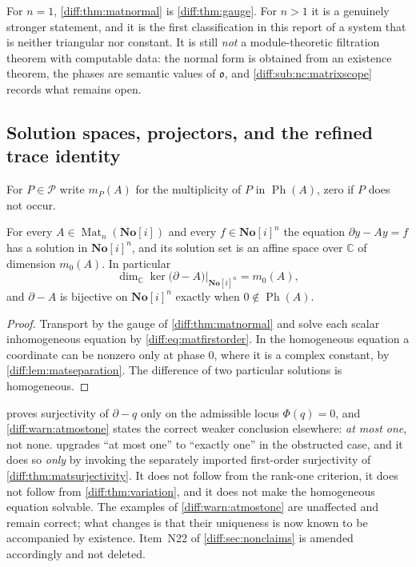 \documentclass[11pt,letterpaper]{article}
\numberwithin{equation}{section}
\theoremstyle{definition}
\theoremstyle{remark}
\newcommand{\SC}{\mathbf{No}[i]}
\newcommand{\C}{\mathbb C}
\newcommand{\der}{\partial}
\newcommand{\Pcl}{\mathcal P}
\newcommand{\Obs}{\mathfrak o}
\newcommand{\Mat}{\operatorname{Mat}}
\newcommand{\Ker}{\operatorname{ker}}
\newcommand{\Ph}{\operatorname{Ph}}
\begin{document}
\begin{remark}
\label{diff:rem:matupgrade}
For $n=1$, \cref{diff:thm:matnormal} is \cref{diff:thm:gauge}. For $n>1$ it is
a genuinely stronger statement, and it is the first classification in this
report of a system that is neither triangular nor constant. It is still
\emph{not} a module-theoretic filtration theorem with computable data: the
normal form is obtained from an existence theorem, the phases are semantic
values of $\Obs$, and \cref{diff:sub:nc:matrixscope} records what remains open.
\end{remark}

\subsection{Solution spaces, projectors, and the refined trace identity}
\label{diff:sub:matprojectors}

For $P\in\Pcl$ write $m_{P}(A)$ for the multiplicity of $P$ in $\Ph(A)$, zero
if $P$ does not occur.

\begin{corollary}
\label{diff:cor:matinhom}
For every $A\in\Mat_{n}(\SC)$ and every $f\in\SC^{n}$ the equation
$\der y-Ay=f$ has a solution in $\SC^{n}$, and its solution set is an affine
space over $\C$ of dimension $m_{0}(A)$. In particular
\[
 \dim_{\C}\Ker\bigl(\der-A\bigr)\big|_{\SC^{n}}=m_{0}(A),
\]
and $\der-A$ is bijective on $\SC^{n}$ exactly when $0\notin\Ph(A)$.
\end{corollary}
\begin{proof}
Transport by the gauge of \cref{diff:thm:matnormal} and solve each scalar
inhomogeneous equation by \cref{diff:eq:matfirstorder}. In the homogeneous
equation a coordinate can be nonzero only at phase $0$, where it is a complex
constant, by \cref{diff:lem:matseparation}. The difference of two particular
solutions is homogeneous.
\end{proof}

\begin{warning}
\label{diff:warn:matinhom}
 proves surjectivity of $\der-q$ only on the
admissible locus $\Phi(q)=0$, and \cref{diff:warn:atmostone} states the
correct weaker conclusion elsewhere: \emph{at most one}, not none.
 upgrades ``at most one'' to ``exactly one'' in the
obstructed case, and it does so \emph{only} by invoking the separately
imported first-order surjectivity of \cref{diff:thm:matsurjectivity}. It does
not follow from the rank-one criterion, it does not follow from
\cref{diff:thm:variation}, and it does not make the homogeneous equation
solvable. The examples of \cref{diff:warn:atmostone} are unaffected and remain
correct; what changes is that their uniqueness is now known to be accompanied
by existence. Item~N22 of \cref{diff:sec:nonclaims} is amended accordingly and
not deleted.
\end{warning}
\end{document}

